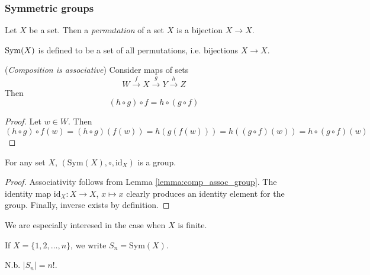 \documentclass[10pt, a4paper, twoside]{report}
\begin{document}
\subsubsection{Symmetric groups}
Let \(X\) be a set. Then a \emph{permutation} of a set \(X\) is a bijection \(X\to X\). 
\begin{definition}
    \(\operatorname{Sym}(X)\) is defined to be a set of all permutations, i.e. bijections \(X\to X\).
\end{definition}
\begin{lemma}
    (\emph{Composition is associative}) Consider maps of sets 
    \[W\xrightarrow{f}X\xrightarrow{g}Y\xrightarrow{h}Z\]
    Then 
    \[(h\circ g)\circ f=h\circ(g\circ f)\]
    \label{lemma:comp_assoc_group}
\end{lemma}
\begin{proof}
    Let \(w\in W\). Then 
    \[(h\circ g)\circ f(w)=(h\circ g)(f(w))=h(g(f(w)))=h((g\circ f)(w))=h\circ(g\circ f)(w)\]
\end{proof}
\begin{proposition}
    For any set \(X\), \((\mathrm{Sym}(X),\circ,\mathrm{id}_X)\) is a group.
\end{proposition}
\begin{proof}
    Associativity follows from Lemma \ref{lemma:comp_assoc_group}. The identity map \(\mathrm{id}_X:X\to X\), \(x\mapsto x\) clearly produces an identity element for the group. Finally, inverse exists by definition.
\end{proof}
We are especially interesed in the case when \(X\) is finite.
\begin{definition}
    If \(X=\{1,2,\ldots,n\}\), we write \(S_n=\mathrm{Sym}(X)\).
\end{definition}
N.b. \(|S_n|=n!\).
\end{document}
